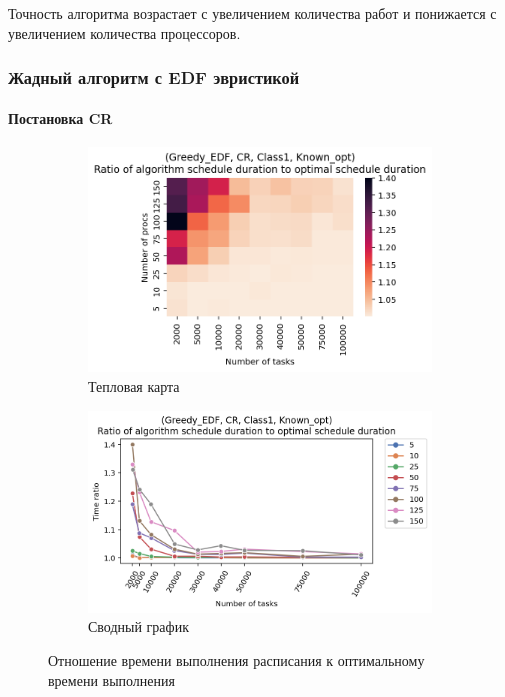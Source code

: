 Точность алгоритма возрастает с увеличением количества работ и понижается с увеличением количества процессоров.

\subsubsection{Жадный алгоритм с EDF эвристикой}

\paragraph{Постановка CR}

\begin{figure}[!htbp]
    \centering
    \begin{subfigure}{0.49\textwidth}
        \includegraphics[width=\textwidth]{imgs/ideal_1/CR_EDF/th.png}
        \caption{Тепловая карта}
        \label{fig:CR-EDF-times-heatmap}
    \end{subfigure}
    \hfill
    \begin{subfigure}{0.49\textwidth}
        \includegraphics[width=\textwidth]{imgs/ideal_1/CR_EDF/gr_amalgamated.png}
        \caption{Сводный график} 
        \label{fig:CR-EDF-times-compiled} 
    \end{subfigure}
    \caption{Отношение времени выполнения расписания к оптимальному времени выполнения}
\end{figure}

